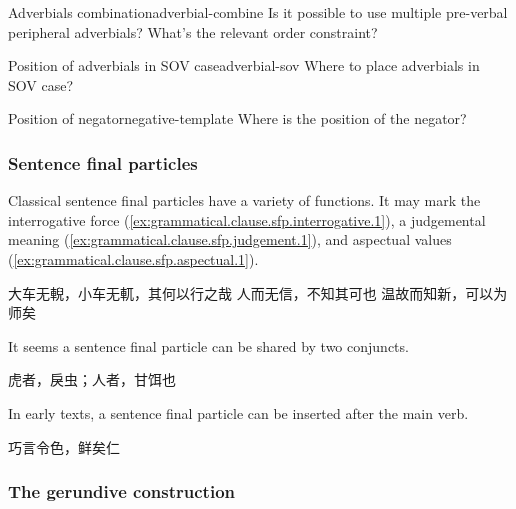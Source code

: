 \documentclass[UTF8, a4paper, oneside, scheme=plain, 12pt]{ctexrep}
\begin{document}
\begin{todobox}{Adverbials combination}{adverbial-combine}
    Is it possible to use multiple pre-verbal peripheral adverbials?
    What's the relevant order constraint?
\end{todobox}

\begin{todobox}{Position of adverbials in SOV case}{adverbial-sov}
    Where to place adverbials in SOV case?
\end{todobox}

\begin{todobox}{Position of negator}{negative-template}
    Where is the position of the negator?
\end{todobox}



\subsubsection{Sentence final particles}\label{sec:grammatical.clause.sfp}

Classical sentence final particles have a variety of functions.
It may mark the interrogative force (\ref{ex:grammatical.clause.sfp.interrogative.1}), 
a judgemental meaning (\ref{ex:grammatical.clause.sfp.judgement.1}),
and aspectual values (\ref{ex:grammatical.clause.sfp.aspectual.1}).

\begin{exe}
    \ex\label{ex:grammatical.clause.sfp.interrogative.1} 大车无輗，小车无軏，其何以行之哉
    \ex\label{ex:grammatical.clause.sfp.judgement.1} 人而无信，不知其可也
    \ex\label{ex:grammatical.clause.sfp.aspectual.1} 温故而知新，可以为师矣
\end{exe}

It seems a sentence final particle can be shared by two conjuncts.

\begin{exe}
    \ex\label{ex:grammatical.clause.sfp.judgement.2} 虎者，戾虫；人者，甘饵也
\end{exe}

In early texts, a sentence final particle can be inserted after the main verb.

\begin{exe}
    \ex 巧言令色，鲜矣仁
\end{exe}


\subsubsection{The gerundive construction}\label{sec:grammatical.clause.verbal.gerundive}
\end{document}
